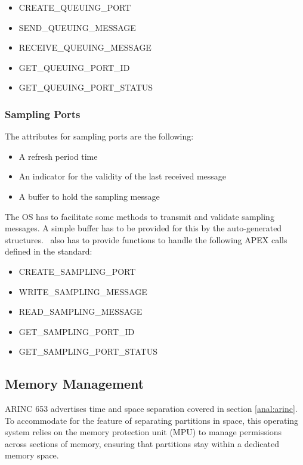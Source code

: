 \begin{itemize}
	\item CREATE\_QUEUING\_PORT
	\item SEND\_QUEUING\_MESSAGE
	\item RECEIVE\_QUEUING\_MESSAGE
	\item GET\_QUEUING\_PORT\_ID
	\item GET\_QUEUING\_PORT\_STATUS
\end{itemize}


\subsubsection{Sampling Ports}
\label{sssec:sampling_ports}
The attributes for sampling ports are the following:
\begin{itemize}
	\item A refresh period time
	\item An indicator for the validity of the last received message
	\item A buffer to hold the sampling message
\end{itemize}

The OS has to facilitate some methods to transmit and validate sampling messages.
A simple buffer has to be provided for this by the auto-generated structures.
\OSname\ also has to provide functions to handle the following APEX calls defined in the standard\cite{arinc_interpartition_comm}:

\begin{itemize}
	\item CREATE\_SAMPLING\_PORT
	\item WRITE\_SAMPLING\_MESSAGE
	\item READ\_SAMPLING\_MESSAGE
	\item GET\_SAMPLING\_PORT\_ID
	\item GET\_SAMPLING\_PORT\_STATUS
\end{itemize}


\subsection{Memory Management}
ARINC 653 advertises time and space separation covered in section \ref{anal:arinc}.
To accommodate for the feature of separating partitions in space,
this operating system relies on the memory protection unit (MPU)
to manage permissions across sections of memory,
ensuring that partitions stay within a dedicated memory space.\\

